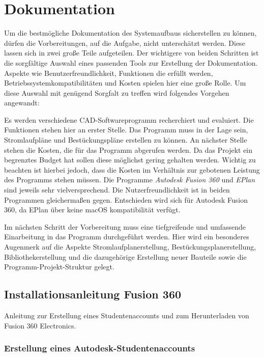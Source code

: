 \chapter{Dokumentation}

\label{cha:umsetzung}
Um die bestmögliche Dokumentation des Systemaufbaus sicherstellen zu können, dürfen die Vorbereitungen, auf die Aufgabe, nicht unterschätzt werden. Diese lassen sich in zwei große Teile aufgeteilen. Der wichtigere von beiden Schritten ist die sorgfältige Auswahl eines passenden Tools zur Erstellung der Dokumentation. Aspekte wie Benutzerfreundlichkeit, Funktionen die erfüllt werden, Betriebssystemkompatibilitäten und Kosten spielen hier eine große Rolle. Um diese Auswahl mit genügend Sorgfalt zu treffen wird folgendes Vorgehen angewandt:

Es werden verschiedene CAD-Softwareprogramm recherchiert und evaluiert. Die Funktionen stehen hier an erster Stelle. Das Programm muss in der Lage sein, Stromlaufpläne und Bestückungspläne erstellen zu können. An nächster Stelle stehen die Kosten, die für das Programm abgerufen werden. Da das Projekt ein begrenztes Budget hat sollen diese möglichst gering gehalten werden. Wichtig zu beachten ist hierbei jedoch, dass die Kosten im Verhältnis zur gebotenen Leistung des Programms stehen müssen. Die Programme \textit{Autodesk Fusion 360} und \textit{EPlan} sind jeweils sehr vielversprechend. Die Nutzerfreundlichkeit ist in beiden Programmen gleichermaßen gegen. Entschieden wird sich für Autodesk Fusion 360, da EPlan über keine macOS kompatibilität verfügt.

Im nächsten Schritt der Vorbereitung muss eine tiefgreifende und umfassende Einarbeitung in das Programm durchgeführt werden. Hier wird ein besonderes Augenmerk auf die Aspekte Stromlaufplanerstellung, Bestückungsplanerstellung, Bibliothekerstellung und die dazugehörige Erstellung neuer Bauteile sowie die Programm-Projekt-Struktur gelegt.



\section{Installationsanleitung Fusion 360}
Anleitung zur Erstellung eines Studentenaccounts und zum Herunterladen von Fusion 360 Electronics.

\subsection*{Erstellung eines Autodesk-Studentenaccounts}

